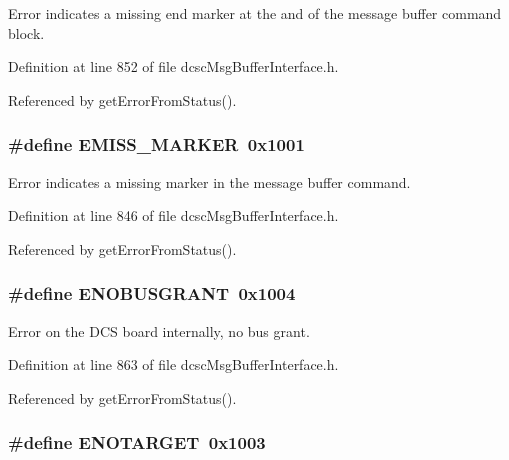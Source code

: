 Error indicates a missing end marker at the and of the message buffer command block. 



Definition at line 852 of file dcsc\-Msg\-Buffer\-Interface.h.

Referenced by get\-Error\-From\-Status().\hypertarget{group__dcsc__msg__buffer__access_g2a64137d0941a60d8a7c65c60cf270d1}{
\subsubsection[EMISS\_\-MARKER]{\setlength{\rightskip}{0pt plus 5cm}\#define EMISS\_\-MARKER~0x1001}}
\label{group__dcsc__msg__buffer__access_g2a64137d0941a60d8a7c65c60cf270d1}


Error indicates a missing marker in the message buffer command. 



Definition at line 846 of file dcsc\-Msg\-Buffer\-Interface.h.

Referenced by get\-Error\-From\-Status().\hypertarget{group__dcsc__msg__buffer__access_g6a6e1cfe5a616e5424852a4519bd47a9}{
\subsubsection[ENOBUSGRANT]{\setlength{\rightskip}{0pt plus 5cm}\#define ENOBUSGRANT~0x1004}}
\label{group__dcsc__msg__buffer__access_g6a6e1cfe5a616e5424852a4519bd47a9}


Error on the DCS board internally, no bus grant. 



Definition at line 863 of file dcsc\-Msg\-Buffer\-Interface.h.

Referenced by get\-Error\-From\-Status().\hypertarget{group__dcsc__msg__buffer__access_g784f97ba20855df7fdcfb165ba30ba4c}{
\subsubsection[ENOTARGET]{\setlength{\rightskip}{0pt plus 5cm}\#define ENOTARGET~0x1003}}
\label{group__dcsc__msg__buffer__access_g784f97ba20855df7fdcfb165ba30ba4c}


